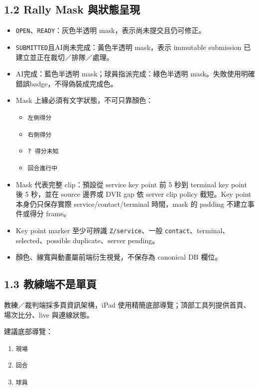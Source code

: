\documentclass[
  9pt,
  a4paper,
]{article}
\providecommand{\tightlist}{%
  \setlength{\itemsep}{0pt}\setlength{\parskip}{0pt}}
\begin{document}
\subsection{1.2 Rally Mask
與狀態呈現}\label{12-rally-mask-ux8207ux72c0ux614bux5448ux73fe}

\begin{itemize}
\tightlist
\item
  \texttt{OPEN}、\texttt{READY}：灰色半透明
  mask，表示尚未提交且仍可修正。
\item
  \texttt{SUBMITTED}且AI尚未完成：黃色半透明 mask，表示 immutable submission
  已建立並正在裁切／排隊／處理。
\item
  AI完成：藍色半透明 mask；球員指派完成：綠色半透明 mask。失敗使用明確錯誤badge，不得偽裝成完成色。
\item
  Mask 上緣必須有文字狀態，不可只靠顏色：

  \begin{itemize}
  \tightlist
  \item
    \texttt{左側得分}
  \item
    \texttt{右側得分}
  \item
    \texttt{?\ 得分未知}
  \item
    \texttt{回合進行中}
  \end{itemize}
\item
  Mask 代表完整 clip：預設從 service key point 前 5 秒到 terminal key
  point 後 5 秒，並在 source 邊界或 DVR gap 依 server clip policy
  截短。Key point 本身仍只保存實際 service/contact/terminal
  時間，mask 的 padding 不建立事件或得分 frame。
\item
  Key point marker 至少可辨識 \texttt{Z/service}、一般
  \texttt{contact}、terminal、selected、possible duplicate、server
  pending。
\item
  顏色、線寬與動畫屬前端衍生視覺，不保存為 canonical DB 欄位。
\end{itemize}

\subsection{1.3
教練端不是單頁}\label{13-ux6559ux7df4ux7aefux4e0dux662fux55aeux9801}

教練／裁判端採多頁資訊架構，iPad
使用精簡底部導覽；頂部工具列提供首頁、場次比分、live 與連線狀態。

建議底部導覽：

\begin{enumerate}
\def\labelenumi{\arabic{enumi}.}
\tightlist
\item
  \texttt{現場}
\item
  \texttt{回合}
\item
  \texttt{球員}
\end{enumerate}
\end{document}
